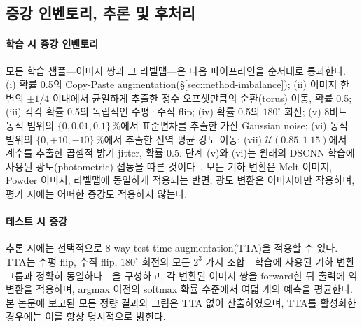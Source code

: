 \subsection{증강 인벤토리, 추론 및 후처리}
\label{sec:method-inference}

\paragraph{학습 시 증강 인벤토리}
모든 학습 샘플---이미지 쌍과 그 라벨맵---은 다음 파이프라인을 순서대로
통과한다. (i) 확률 0.5의 Copy-Paste
augmentation(\S\ref{sec:method-imbalance}); (ii) 이미지 한 변의
$\pm 1/4$ 이내에서 균일하게 추출한 정수 오프셋만큼의 순환(torus)
이동, 확률 0.5; (iii) 각각 확률 0.5의 독립적인 수평·수직 flip;
(iv) 확률 0.5의 $180^{\circ}$ 회전; (v) 8비트 동적 범위의
$\{0, 0.01, 0.1\}\,\%$에서 표준편차를 추출한 가산 Gaussian noise;
(vi) 동적 범위의 $\{0, +10, -10\}\,\%$에서 추출한 전역 평균 강도
이동; (vii) $\mathcal{U}(0.85, 1.15)$에서 계수를 추출한 곱셈적 밝기
jitter, 확률 0.5. 단계 (v)와 (vi)는 원래의 DSCNN 학습에 사용된
광도(photometric) 섭동을 따른 것이다~\cite{Scime2020DSCNN}. 모든 기하
변환은 Melt 이미지, Powder 이미지, 라벨맵에 동일하게 적용되는 반면,
광도 변환은 이미지에만 작용하며, 평가 시에는 어떠한 증강도 적용하지
않는다.

\paragraph{테스트 시 증강}
추론 시에는 선택적으로 8-way test-time augmentation(TTA)을 적용할 수
있다. TTA는 수평 flip, 수직 flip, $180^{\circ}$ 회전의 모든 $2^{3}$
가지 조합---학습에 사용된 기하 변환 그룹과 정확히 동일하다---을
구성하고, 각 변환된 이미지 쌍을 forward한 뒤 출력에 역변환을 적용하며,
argmax 이전의 softmax 확률 수준에서 여덟 개의 예측을 평균한다. 본
논문에 보고된 모든 정량 결과와 그림은 TTA 없이 산출하였으며, TTA를
활성화한 경우에는 이를 항상 명시적으로 밝힌다.


